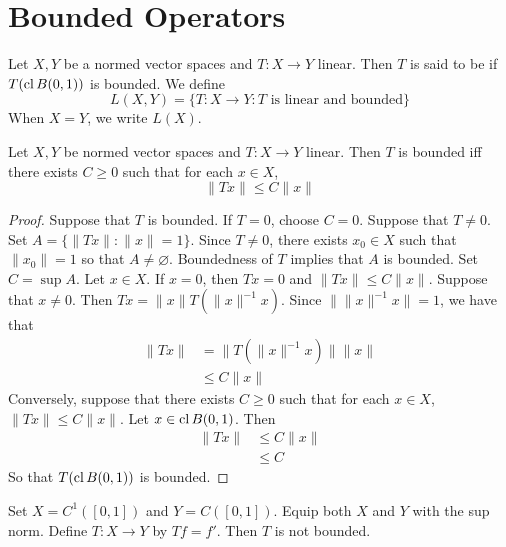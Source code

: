 \documentclass{book}
\begin{document}
	
	
	
	
	
	
	
	
	
	
	
	
	\newpage
	\section{Bounded Operators}
	
	\begin{defn}  
		Let $X,Y$ be a normed vector spaces and $T:X \rightarrow Y$ linear. Then $T$ is said to be  if $T(\operatorname{cl} B(0,1))$ is bounded. We define $$L(X,Y) = \{T:X \rightarrow Y: T \text{ is linear and bounded}\}$$
		When $X=Y$, we write $L(X)$.
	\end{defn}
	
	\begin{ex}  
		Let $X,Y$ be normed vector spaces and $T:X \rightarrow Y$ linear. Then $T$ is bounded iff there exists $C \geq 0$ such that for each $x \in X$, $$\|Tx \|\leq C \|x \|$$ 
	\end{ex}
	
	\begin{proof}
	Suppose that $T$ is bounded. If $T = 0$, choose $C = 0$. Suppose that $T \neq 0$. Set $ A = \{\|Tx\|: \|x\| =1\}$. Since $T \neq 0$, there exists $x_0 \in X$ such that $\|x_0\| = 1$ so that $A \neq \varnothing$.  Boundedness of $T$ implies that $A$ is bounded. Set $C = \sup A$. Let $x \in X$. If $x = 0$, then $Tx = 0$ and $\|Tx\| \leq C \|x\|$. Suppose that $x \neq 0$. Then $Tx = \|x\| T(\|x\|^{-1} x)$. Since $\|\|x\|^{-1} x\| = 1$, we have that
	\begin{align*}
	\|Tx\|
	&= \|T(\|x\|^{-1} x)\| \|x\|  \\
	& \leq C\|x\| 
\end{align*}	
Conversely, suppose that there exists $C \geq 0$ such that for each $x \in X$, $\|Tx \|\leq C \|x \|$. Let $x \in \operatorname{cl} B(0,1)$. Then 
	\begin{align*}
	\|Tx\| 
	&\leq C \|x\| \\
	&\leq C
	\end{align*}
So that $T(\operatorname{cl} B(0,1))$ is bounded. 
	\end{proof}
	
	\begin{ex} 
	Set $X = C^{1}([0,1])$ and $Y = C([0,1])$. Equip both $X$ and $Y$ with the sup norm. Define $T:X \rightarrow Y$ by $Tf = f'$. Then $T$ is not bounded.
	\end{ex}
	
\end{document}
